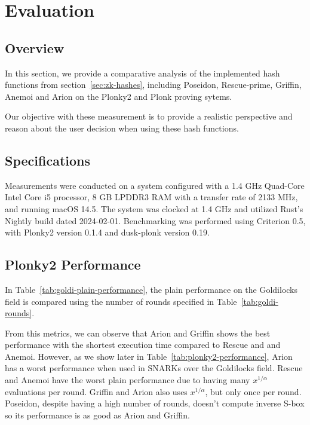 \chapter{Evaluation}
\label{sec:evaluation}
\section*{Overview}
In this section, we provide a comparative analysis of the implemented hash functions from section~\ref{sec:zk-hashes}, including Poseidon, Rescue-prime, Griffin, Anemoi and Arion on the Plonky2 and Plonk proving sytems.

Our objective with these measurement is to provide a realistic perspective and reason about the user decision when using these hash functions.

\section{Specifications}
Measurements were conducted on a system configured with a 1.4 GHz Quad-Core Intel Core i5 processor, 8 GB LPDDR3 RAM with a transfer rate of 2133 MHz, and running macOS 14.5. The system was clocked at 1.4 GHz and utilized Rust's Nightly build dated 2024-02-01. Benchmarking was performed using Criterion 0.5, with Plonky2 version 0.1.4 and dusk-plonk version 0.19.

\section{Plonky2 Performance}

In Table~\ref{tab:goldi-plain-performance}, the plain performance on the Goldilocks field is compared using the number of rounds specified in Table~\ref{tab:goldi-rounds}.

From this metrics, we can observe that Arion and Griffin shows the best performance with the shortest execution time compared to Rescue and and Anemoi. However, as we show later in Table~\ref{tab:plonky2-performance}, Arion has a worst performance when used in SNARKs over the Goldilocks field. Rescue and Anemoi have the worst plain performance due to having many $x^{1/\alpha}$ evaluations per round. Griffin and Arion also uses $x^{1/\alpha}$, but only once per round. Poseidon, despite having a high number of rounds, doesn't compute inverse S-box so its performance is as good as Arion and Griffin.

